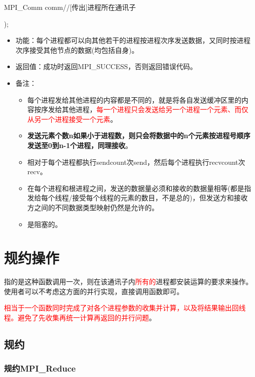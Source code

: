 \documentclass[UTF8]{article}%
\begin{document}
    \qquad MPI\_Comm comm//[传出]进程所在通讯子
    
);

\begin{itemize}
    \item 功能：每个进程都可以向其他若干的进程按进程次序发送数据，又同时按进程次序接受其他节点的数据(均包括自身)。
    \item 返回值：成功时返回MPI\_SUCCESS，否则返回错误代码。
    \item 备注：
    
    {
        \begin{itemize}
            \item 每个进程发给其他进程的内容都是不同的，就是将各自发送缓冲区里的内容按序发给其他进程，\textcolor{red}{每一个进程只会发送给另一个进程一个元素、而仅从另一个进程接受一个元素}。
            \item \textbf{发送元素个数n如果小于进程数，则只会将数据中的n个元素按进程号顺序发送至0到n-1个进程，同理接收}。
            \item 相对于每个进程都执行sendcount次send，然后每个进程执行recvcount次recv。
            \item 在每个进程和根进程之间，发送的数据量必须和接收的数据量相等(都是指发给每个线程/接受每个线程的元素的数目，不是总的)，但发送方和接收方之间的不同数据类型映射仍然是允许的。
            \item 是阻塞的。
        \end{itemize}
    }
    
\end{itemize}

\section{规约操作}

指的是这种函数调用一次，则在该通讯子内\textcolor{red}{所有的}进程都安装运算的要求来操作。使用者可以不考虑这方面的并行实现，直接调用函数即可。

\textcolor{red}{相当于一个函数同时完成了对各个进程参数的收集并计算，以及将结果输出回线程。避免了先收集再统一计算再返回的并行问题}。

\subsection{规约}

\subsubsection{规约MPI\_Reduce}
\end{document}
